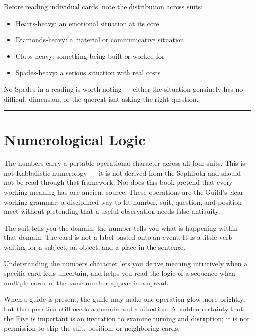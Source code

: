 Before reading individual cards, note the distribution across suits:

\begin{itemize}
\tightlist
\item
  Hearts-heavy: an emotional situation at its core
\item
  Diamonds-heavy: a material or communicative situation
\item
  Clubs-heavy: something being built or worked for
\item
  Spades-heavy: a serious situation with real costs
\end{itemize}

No Spades in a reading is worth noting --- either the situation genuinely has no difficult dimension, or the querent isn\textquotesingle t asking the right question.

\begin{center}\rule{0.5\linewidth}{0.5pt}\end{center}

\section{Numerological Logic}\label{numerological-logic}

The numbers carry a portable operational character across all four suits. This
is not Kabbalistic numerology --- it is not derived from the Sephiroth and
should not be read through that framework. Nor does this book pretend that every
working meaning has one ancient source. These operations are the Guild's clear
working grammar: a disciplined way to let number, suit, question, and position
meet without pretending that a useful observation needs false antiquity.

The suit tells you the domain; the number tells you what is happening within
that domain. The card is not a label pasted onto an event. It is a little verb
waiting for a subject, an object, and a place in the sentence.

Understanding the number\textquotesingle s character lets you derive meaning intuitively when a specific card feels uncertain, and helps you read the logic of a sequence when multiple cards of the same number appear in a spread.

When a guide is present, the guide may make one operation glow more brightly,
but the operation still needs a domain and a situation. A sudden certainty that
the Five is important is an invitation to examine turning and disruption; it is
not permission to skip the suit, position, or neighboring cards.

